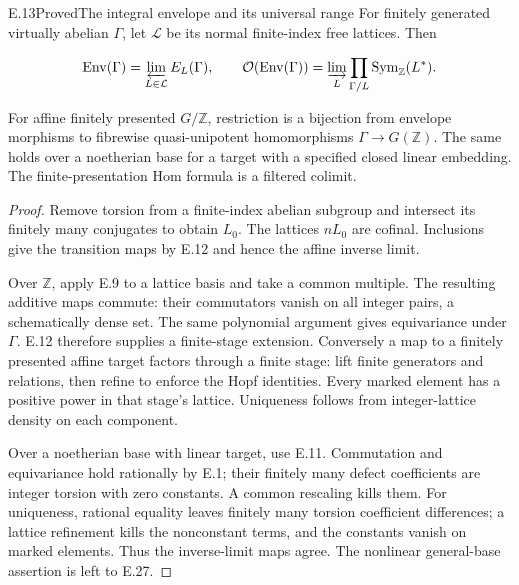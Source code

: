 \begin{statement}{E.13}{Proved}{The integral envelope and its universal range}
For finitely generated virtually abelian $\Gamma$, let
$\mathcal L$ be its normal finite-index free lattices.
Then

$$
\operatorname{Env}(\Gamma)=\varprojlim_{L\in\mathcal L}E_L(\Gamma),
 \qquad
 \mathcal O(\operatorname{Env}(\Gamma))
 =\varinjlim_L\prod_{\Gamma/L}\operatorname{Sym}_{\mathbb Z}(L^*).
$$

For affine finitely presented $G/\mathbb Z$, restriction
is a bijection from envelope morphisms to fibrewise
quasi-unipotent homomorphisms $\Gamma\to G(\mathbb Z)$.
The same holds over a noetherian base for a target with
a specified closed linear embedding.
The finite-presentation Hom formula is a filtered colimit.
\end{statement}
\begin{proof}
Remove torsion from a finite-index abelian subgroup and
intersect its finitely many conjugates to obtain $L_0$.
The lattices $nL_0$ are cofinal.
Inclusions give the transition maps by E.12 and hence
the affine inverse limit.

Over $\mathbb Z$, apply E.9 to a lattice basis and take
a common multiple. The resulting additive maps commute:
their commutators vanish on all integer pairs, a
schematically dense set. The same polynomial argument
gives equivariance under $\Gamma$.
E.12 therefore supplies a finite-stage extension.
Conversely a map to a finitely presented affine target
factors through a finite stage: lift finite generators
and relations, then refine to enforce the Hopf identities.
Every marked element has a positive power in that
stage's lattice. Uniqueness follows from integer-lattice
density on each component.

Over a noetherian base with linear target, use E.11.
Commutation and equivariance hold rationally by E.1;
their finitely many defect coefficients are integer
torsion with zero constants. A common rescaling kills
them. For uniqueness, rational equality leaves finitely
many torsion coefficient differences; a lattice refinement
kills the nonconstant terms, and the constants vanish
on marked elements. Thus the inverse-limit maps agree.
The nonlinear general-base assertion is left to E.27.
\end{proof}

